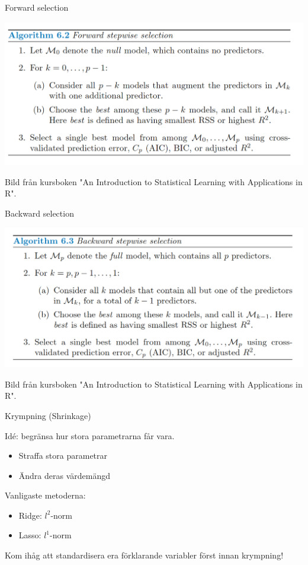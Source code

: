 \documentclass[10pt,english]{beamer}
\newenvironment{nscenter}
 {\parskip=0pt\par\nopagebreak\centering}
 {\par\noindent\ignorespacesafterend}
\begin{document}
\begin{frame}{Forward selection}
    \begin{nscenter}
        \includegraphics[width=\textwidth]{figs/Forward stepwise selection.png}
    \end{nscenter}
    Bild från kursboken "An Introduction to Statistical Learning with Applications in R".

\end{frame}

\begin{frame}{Backward selection}
    \begin{nscenter}
        \includegraphics[width=\textwidth]{figs/Backward stepwise selection.png}
    \end{nscenter}
    Bild från kursboken "An Introduction to Statistical Learning with Applications in R".

\end{frame}

\begin{frame}{Krympning (Shrinkage)}
    
    Idé: begränsa hur stora parametrarna får vara.
    \begin{itemize}
        \item Straffa stora parametrar
        \item Ändra deras värdemängd
    \end{itemize}
    Vanligaste metoderna:
    \begin{itemize}
        \item Ridge: $l^2$-norm
        \item Lasso: $l^1$-norm
    \end{itemize}

    Kom ihåg att standardisera era förklarande variabler först innan krympning!

\end{frame}
\end{document}
